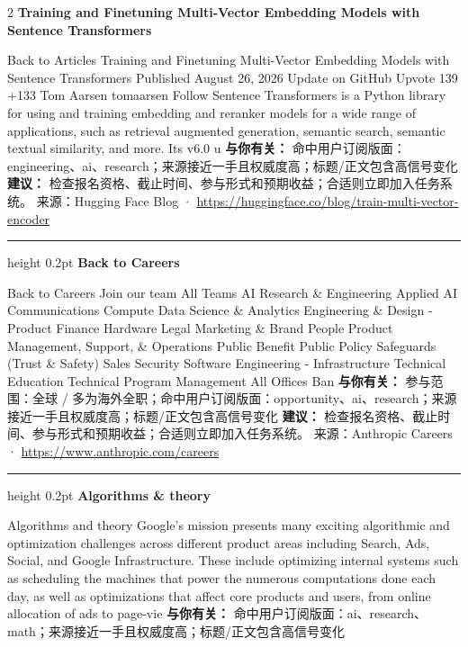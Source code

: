\documentclass[10.5pt]{ctexart}
\begin{document}
\begin{multicols}{2}
{\large\bfseries Training and Finetuning Multi-Vector Embedding Models with Sentence Transformers}\par
Back to Articles Training and Finetuning Multi-Vector Embedding Models with Sentence Transformers Published August 26, 2026 Update on GitHub Upvote 139 +133 Tom Aarsen tomaarsen Follow Sentence Transformers is a Python library for using and training embedding and reranker models for a wide range of applications, such as retrieval augmented generation, semantic search, semantic textual similarity, and more. Its v6.0 u
\textbf{与你有关：} 命中用户订阅版面：engineering、ai、research；来源接近一手且权威度高；标题/正文包含高信号变化
\textbf{建议：} 检查报名资格、截止时间、参与形式和预期收益；合适则立即加入任务系统。
{\footnotesize\color{ormuted} 来源：Hugging Face Blog · \url{https://huggingface.co/blog/train-multi-vector-encoder}}
\vspace{2mm}
\hrule height 0.2pt
\vspace{2mm}
{\large\bfseries Back to Careers}\par
Back to Careers Join our team All Teams AI Research \& Engineering Applied AI Communications Compute Data Science \& Analytics Engineering \& Design - Product Finance Hardware Legal Marketing \& Brand People Product Management, Support, \& Operations Public Benefit Public Policy Safeguards (Trust \& Safety) Sales Security Software Engineering - Infrastructure Technical Education Technical Program Management All Offices Ban
\textbf{与你有关：} 参与范围：全球 / 多为海外全职；命中用户订阅版面：opportunity、ai、research；来源接近一手且权威度高；标题/正文包含高信号变化
\textbf{建议：} 检查报名资格、截止时间、参与形式和预期收益；合适则立即加入任务系统。
{\footnotesize\color{ormuted} 来源：Anthropic Careers · \url{https://www.anthropic.com/careers}}
\vspace{2mm}
\hrule height 0.2pt
\vspace{2mm}
{\large\bfseries Algorithms \& theory}\par
Algorithms and theory Google’s mission presents many exciting algorithmic and optimization challenges across different product areas including Search, Ads, Social, and Google Infrastructure. These include optimizing internal systems such as scheduling the machines that power the numerous computations done each day, as well as optimizations that affect core products and users, from online allocation of ads to page-vie
\textbf{与你有关：} 命中用户订阅版面：ai、research、math；来源接近一手且权威度高；标题/正文包含高信号变化

\end{multicols}
\end{document}

